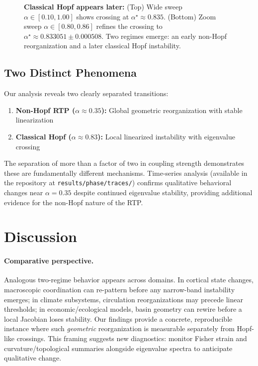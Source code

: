 \documentclass[11pt,twocolumn]{article}
\begin{document}
\begin{figure}[t]
  \centering
  
  \vspace{0.4em}
  
  \caption{%
  \textbf{Classical Hopf appears later:} (Top) Wide sweep $\alpha\in[0.10,1.00]$ shows crossing
  at $\alpha^\star\approx0.835$. (Bottom) Zoom sweep $\alpha\in[0.80,0.86]$ refines the crossing
  to $\alpha^\star\approx0.833051\pm0.000508$. Two regimes emerge: an early non-Hopf reorganization
  and a later classical Hopf instability.
  }
  \label{fig:eigs-wide-zoom}
\end{figure}

\subsection{Two Distinct Phenomena}

Our analysis reveals two clearly separated transitions:

\begin{enumerate}
  \item \textbf{Non-Hopf RTP ($\alpha \approx 0.35$):} Global geometric reorganization with stable linearization
  \item \textbf{Classical Hopf ($\alpha \approx 0.83$):} Local linearized instability with eigenvalue crossing
\end{enumerate}

The separation of more than a factor of two in coupling strength demonstrates these are fundamentally different
mechanisms. Time-series analysis (available in the repository at \texttt{results/phase/traces/}) confirms
qualitative behavioral changes near $\alpha = 0.35$ despite continued eigenvalue stability, providing
additional evidence for the non-Hopf nature of the RTP.

\section{Discussion}

\paragraph{Comparative perspective.}
Analogous two-regime behavior appears across domains. In cortical state changes, macroscopic coordination can re-pattern before any narrow-band instability emerges; in climate subsystems, circulation reorganizations may precede linear thresholds; in economic/ecological models, basin geometry can rewire before a local Jacobian loses stability. Our findings provide a concrete, reproducible instance where such \emph{geometric} reorganization is measurable separately from Hopf-like crossings. This framing suggests new diagnostics: monitor Fisher strain and curvature/topological summaries alongside eigenvalue spectra to anticipate qualitative change.
\end{document}
